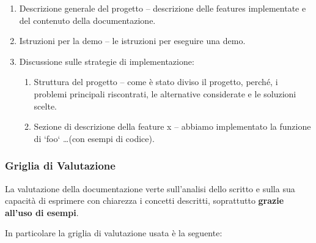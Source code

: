 \begin{tcolorbox}[colback=green!20!white,colframe=green!75!black,title=Il corpo della Documentazione]

 \begin{enumerate}

  \item Descrizione generale del progetto -- descrizione delle features
        implementate e del contenuto della documentazione.

  \item Istruzioni per la demo -- le istruzioni per eseguire una demo.

  \item Discussione sulle strategie di implementazione:

        \begin{enumerate}

         \item Struttura del progetto -- come è stato diviso il progetto,
               perché, i problemi principali riscontrati, le alternative considerate e
               le soluzioni scelte.

         \item Sezione di descrizione della feature x -- abbiamo implementato la
               funzione di `foo` \dots (con esempi di codice).

        \end{enumerate}

 \end{enumerate}

\end{tcolorbox}

\subsubsection{Griglia di Valutazione}

La valutazione della documentazione verte sull'analisi dello scritto e sulla sua
capacità di esprimere con chiarezza i concetti descritti, soprattutto \textbf{grazie
 all'uso di esempi}.

In particolare la griglia di valutazione usata è la seguente:

